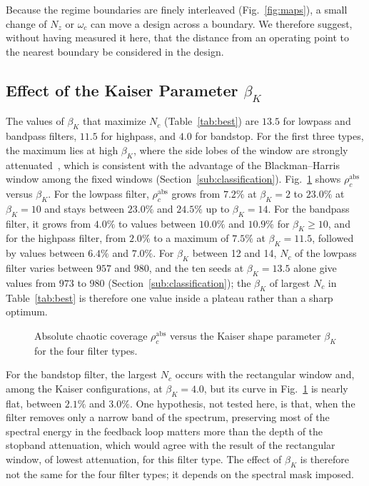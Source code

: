 \documentclass[journal]{IEEEtran}
\begin{document}
Because the regime boundaries are finely interleaved (Fig.~\ref{fig:maps}), a small change of $N_z$ or $\omega_c$
can move a design across a boundary. We therefore suggest, without having
measured it here, that the distance from an operating point to the nearest
boundary be considered in the design.

\subsection{Effect of the Kaiser Parameter $\beta_K$}\label{sub:beta}
The values of $\beta_K$ that maximize $N_c$ (Table~\ref{tab:best}) are $13.5$
for lowpass and bandpass filters, $11.5$ for highpass, and $4.0$ for bandstop.
For the first three types, the maximum lies at high $\beta_K$, where the side
lobes of the window are strongly attenuated~\cite{Oppenheim2009}, which is
consistent with the advantage of the Blackman--Harris window among the fixed
windows (Section~\ref{sub:classification}). Fig.~\ref{fig:beta} shows
$\rho_c^{\text{abs}}$ versus $\beta_K$. For the lowpass filter,
$\rho_c^{\text{abs}}$ grows from $7.2\%$ at $\beta_K=2$ to $23.0\%$ at
$\beta_K=10$ and stays between $23.0\%$ and $24.5\%$ up to $\beta_K=14$. For
the bandpass filter, it grows from $4.0\%$ to values between $10.0\%$ and
$10.9\%$ for $\beta_K\ge10$, and for the highpass filter, from $2.0\%$ to a
maximum of $7.5\%$ at $\beta_K=11.5$, followed by values between $6.4\%$ and
$7.0\%$. For $\beta_K$ between 12 and 14, $N_c$ of the lowpass filter varies between
$957$ and $980$, and the ten seeds at $\beta_K=13.5$ alone give values from
$973$ to $980$ (Section~\ref{sub:classification}); the $\beta_K$ of largest
$N_c$ in Table~\ref{tab:best} is therefore one value inside a plateau rather
than a sharp optimum.

\begin{figure}[!t]
\centering

\caption{Absolute chaotic coverage $\rho_c^{\text{abs}}$ versus the Kaiser
shape parameter $\beta_K$ for the four filter types.}
\label{fig:beta}
\end{figure}

For the bandstop filter, the largest $N_c$ occurs with the rectangular window
and, among the Kaiser configurations, at $\beta_K=4.0$, but its curve in
Fig.~\ref{fig:beta} is nearly flat, between $2.1\%$ and $3.0\%$. One
hypothesis, not tested here, is that, when the filter removes only a narrow
band of the spectrum, preserving most of the spectral energy in the feedback
loop matters more than the depth of the stopband attenuation, which would
agree with the result of the rectangular window, of lowest attenuation, for
this filter type. The
effect of $\beta_K$ is therefore not the same for the four filter types; it
depends on the spectral mask imposed.
\end{document}
